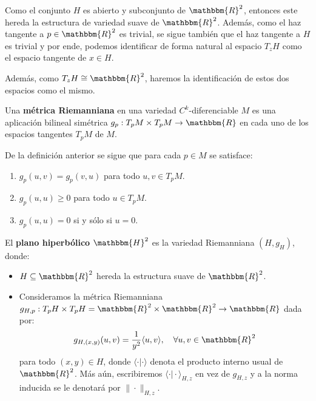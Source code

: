 \documentclass[12pt]{report}
\newcounter{it}
\theoremstyle{largebreak}
\newcommand\cf[3]{\ensuremath{#1:#2\rightarrow#3}}
\newcommand{\bbm}[1]{\ensuremath{\mathbbm{#1}}}
\newcommand{\norm}[1]{\|#1\|}
\begin{document}
    Como el conjunto $H$ es abierto y subconjunto de $\bbm{R}^2$, entonces este hereda la estructura de variedad suave de $\bbm{R}^2$. Además, como el haz tangente a $p\in\bbm{R}^2$ es trivial, se sigue también que el haz tangente a $H$ es trivial y por ende, podemos identificar de forma natural al espacio $T_zH$ como el espacio tangente de $x\in H$.

    Además, como $T_zH\cong\bbm{R}^2$, haremos la identificación de estos dos espacios como el mismo.

    \begin{mydef}
        Una \textbf{métrica Riemanniana} en una variedad $C^k$-diferenciable $M$ es una aplicación bilineal simétrica $\cf{g_p}{T_pM\times T_pM}{\bbm{R}}$ en cada uno de los espacios tangentes $T_pM$ de $M$.
    \end{mydef}

    \begin{obs}
        De la definición anterior se sigue que para cada $p\in M$ se satisface:
        \begin{enumerate}[label = \textit{(\arabic*)}]
            \item $g_p(u,v)=g_p(v,u)$ para todo $u,v\in T_pM$.
            \item $g_p(u,u)\geq0$ para todo $u\in T_pM$.
            \item $g_p(u,u)=0$ si y sólo si $u=0$.
        \end{enumerate}
    \end{obs}

    \begin{mydef}
        El \textbf{plano hiperbólico} $\bbm{H}^2$ es la variedad Riemanniana $(H,g_H)$, donde:
        \begin{itemize}
            \item $H\subseteq\bbm{R}^2$ hereda la estructura suave de $\bbm{R}^2$.
            \item Consideramos la métrica Riemanniana $\cf{g_{H,p}}{T_pH\times T_pH=\bbm{R}^2\times \bbm{R}^2}{\bbm{R}}$ dada por:
            \begin{equation*}
                g_{H,(x,y)}(u,v)=\frac{1}{y^2}\langle u,v\rangle,\quad\forall u,v\in\bbm{R}^2
            \end{equation*}
            para todo $(x,y)\in H$, donde $\langle\cdot\big|\cdot \rangle$ denota el producto interno usual de $\bbm{R}^2$. Más aún, escribiremos $\langle\cdot\big|\cdot \rangle_{ H,z}$ en vez de $g_{H,z}$ y a la norma inducida se le denotará por $\norm{\cdot}_{H,z}$.
        \end{itemize}
    \end{mydef}
\end{document}
